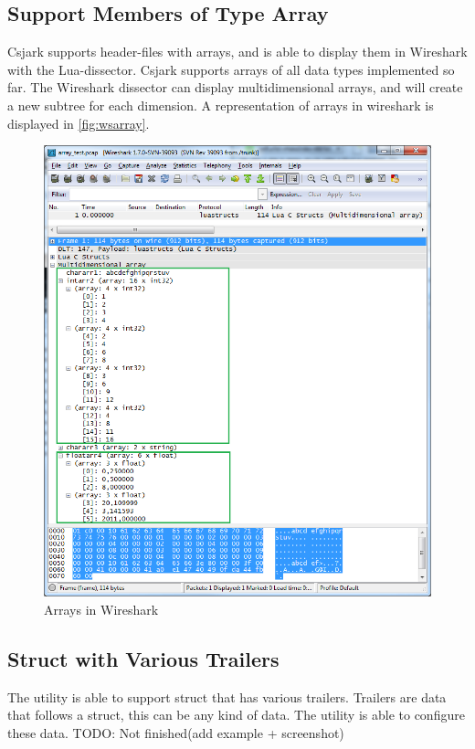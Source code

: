 

\subsection{Support Members of Type Array}
Csjark supports header-files with arrays, and is able to display them in 
Wireshark with the Lua-dissector. Csjark supports arrays of all data types 
implemented so far. The Wireshark dissector can display multidimensional 
arrays, and will create a new subtree for each dimension.  A representation of 
arrays in wireshark is displayed in \autoref{fig:wsarray}.

\begin{figure}[ht]
	\center
	\includegraphics[width=\textwidth]{./sprints/img/wireshark_array}
	\caption{Arrays in Wireshark\label{fig:wsarray}}
\end{figure}

\subsection{Struct with Various Trailers}
The utility is able to support struct that has various trailers. Trailers are
data that follows a struct, this can be any kind of data. The utility is able to configure these data.
TODO: Not finished(add example + screenshot)

